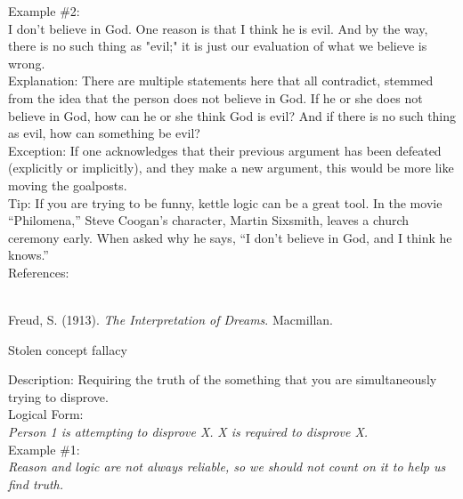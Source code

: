 \documentclass[a4paper,12pt,single,pdftex]{scrartcl}
\begin{document}
    
      Example \#2:
    \\

    
      I don't believe in God. One reason is that I think he is evil. And by the way, there is no such thing as "evil;" it is just our evaluation of what we believe is wrong.
    \\

    
      Explanation: There are multiple statements here that all contradict, stemmed from the idea that the person does not believe in God. If he or she does not believe in God, how can he or she think God is evil? And if there is no such thing as evil, how can something be evil?
    \\

    
      Exception: If one acknowledges that their previous argument has been defeated (explicitly or implicitly), and they make a new argument, this would be more like moving the goalposts.
    \\

    
      Tip: If you are trying to be funny, kettle logic can be a great tool. In the movie “Philomena,” Steve Coogan’s character, Martin Sixsmith, leaves a church ceremony early. When asked why he says, “I don’t believe in God, and I think he knows.”
    \\

    References:

    
      
        
      \\

      
        
          Freud, S. (1913). {\it The Interpretation of Dreams}. Macmillan.
        
      
    
  

Stolen concept fallacy
    
      
        Description: Requiring the truth of the something that you are simultaneously trying to disprove.
      \\

      
        Logical Form:
      \\

      
        {\em Person 1 is attempting to disprove X.} \newline
{\em X is required to disprove X.}
      \\

      
        Example \#1:
      \\

      
        {\em Reason and logic are not always reliable, so we should not count on it to help us find truth.}
      \\
\end{document}
